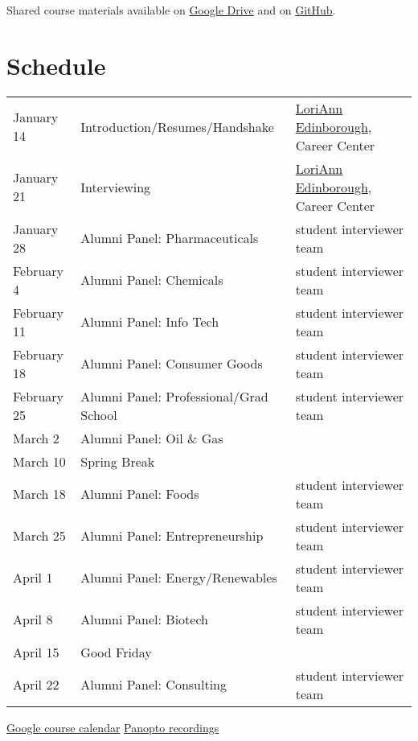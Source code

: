 \documentclass[11pt]{article}
\begin{document}
\noindent Shared course materials available on \href{https://drive.google.com/drive/folders/12p1B5icXV4FetwMoPTR7hkxTTPMj53qA?usp=sharing}{Google Drive} and on \href{https://github.com/wmfschneider/CBE20290}{GitHub}.

\section{Schedule}
\label{sec:orgb7e623f}
\begin{center}
\begin{tabular}{lll}
January 14 & Introduction/Resumes/Handshake & \href{https://www.linkedin.com/in/loriann-edinborough/}{LoriAnn Edinborough}, Career Center\\
January 21 & Interviewing & \href{https://www.linkedin.com/in/loriann-edinborough/}{LoriAnn Edinborough}, Career Center\\
January 28 & Alumni Panel: Pharmaceuticals & student interviewer team\\
February 4 & Alumni Panel: Chemicals & student interviewer team\\
February 11 & Alumni Panel: Info Tech & student interviewer team\\
February 18 & Alumni Panel: Consumer Goods & student interviewer team\\
February 25 & Alumni Panel: Professional/Grad School & student interviewer team\\
March 2 & Alumni Panel: Oil \& Gas & \\
March 10 & Spring Break & \\
March 18 & Alumni Panel: Foods & student interviewer team\\
March 25 & Alumni Panel: Entrepreneurship & student interviewer team\\
April 1 & Alumni Panel: Energy/Renewables & student interviewer team\\
April 8 & Alumni Panel: Biotech & student interviewer team\\
April 15 & Good Friday & \\
April 22 & Alumni Panel: Consulting & student interviewer team\\
\end{tabular}
\end{center}

\href{https://calendar.google.com/calendar/u/0?cid=Y183NG02cDJnYWQ2NDQ4OTUzZGthaHJia2Nnc0Bncm91cC5jYWxlbmRhci5nb29nbGUuY29t}{Google course calendar}      \href{https://notredame.hosted.panopto.com/Panopto/Pages/Sessions/List.aspx?folderID=b93d46fc-da0a-4736-b7e1-acc1018685ee}{Panopto recordings} 
\end{document}
